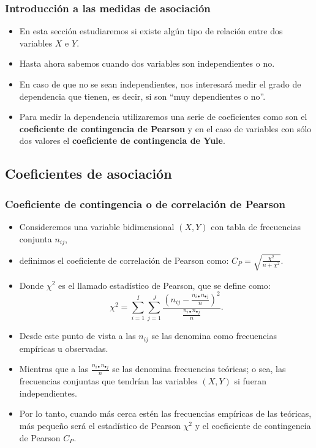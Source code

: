 \begin{frame}
\frametitle{Introducción a las medidas de asociación}
\begin{itemize}
\item En esta sección estudiaremos si existe algún tipo de relación entre dos variables $X$ e
$Y$.
\item Hasta ahora sabemos cuando dos variables son independientes o no. 
\item En caso de  que no se sean
independientes,  nos interesará medir el grado de dependencia que tienen, es decir, si
son ``muy dependientes o no''.
\item Para medir la dependencia utilizaremos una serie de coeficientes como son  el \textbf{coeficiente
de contingencia de Pearson} y  en el caso de variables con sólo dos valores el  \textbf{coeficiente de contingencia de Yule}.
\end{itemize}
\end{frame}

\subsection{Coeficientes de asociación}
\begin{frame}
\frametitle{Coeficiente de contingencia o de correlación de Pearson}
\begin{itemize}
\item Consideremos una variable bidimensional $(X,Y)$ con tabla de frecuencias conjunta $n_{ij}$,
\item definimos el coeficiente de correlación de Pearson como:
$C_P= \sqrt{\frac{\chi^2}{n+\chi^2}}$.
\item Donde $\chi^2$ es el llamado estadístico de Pearson, que se define como:
$$
\chi^2=\sum\limits_{i=1}^I\sum\limits_{j=1}^J \frac{ \left( n_{ij}- \frac{ n_{i\bullet}
n_{\bullet j} }{n} \right)^2 } {\frac{n_{i\bullet} n_{\bullet j}}{n}}.
$$
\end{itemize}
\end{frame}

\begin{frame}
\begin{itemize}
\item Desde este punto de vista a las  $n_{ij}$ se las denomina como frecuencias empíricas u observadas.
\item Mientras 	que  a las $\frac{n_{i\bullet} n_{\bullet j}}{n}$
 se las denomina frecuencias teóricas; o sea, las
frecuencias conjuntas que tendrían las variables $(X,Y)$ si fueran independientes.
\item Por lo tanto, cuando más cerca estén las frecuencias empíricas de las teóricas, más
pequeño será el estadístico de Pearson  $\chi^2$ y el coeficiente de contingencia de
Pearson $C_P$.
\end{itemize}
\end{frame}


